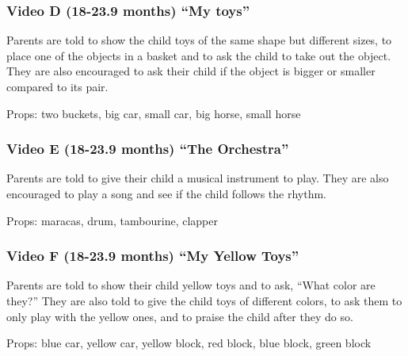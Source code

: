 \documentclass[man,floatsintext]{apa6}
\begin{document}
\begin{appendix}
{\subsubsection{Video D (18-23.9 months) ``My
toys''}\label{video-d-18-23.9-months-my-toys}}

Parents are told to show the child toys of the same shape but different
sizes, to place one of the objects in a basket and to ask the child to
take out the object. They are also encouraged to ask their child if the
object is bigger or smaller compared to its pair.

Props: two buckets, big car, small car, big horse, small horse

\hypertarget{video-e-18-23.9-months-the-orchestra}{%
\subsubsection{Video E (18-23.9 months) ``The
Orchestra''}\label{video-e-18-23.9-months-the-orchestra}}

Parents are told to give their child a musical instrument to play. They
are also encouraged to play a song and see if the child follows the
rhythm.

Props: maracas, drum, tambourine, clapper

\hypertarget{video-f-18-23.9-months-my-yellow-toys}{%
\subsubsection{Video F (18-23.9 months) ``My Yellow
Toys''}\label{video-f-18-23.9-months-my-yellow-toys}}

Parents are told to show their child yellow toys and to ask, ``What
color are they?'' They are also told to give the child toys of different
colors, to ask them to only play with the yellow ones, and to praise the
child after they do so.

Props: blue car, yellow car, yellow block, red block, blue block, green
block
\end{appendix}
\end{document}
